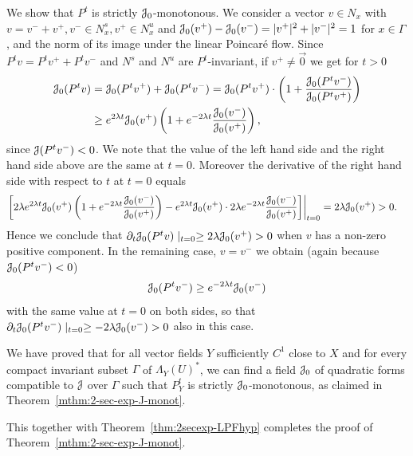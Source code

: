 \documentclass[12pt,reqno]{amsart}
\numberwithin{equation}{section}
\theoremstyle{plain}
\theoremstyle{definition}
\renewcommand{\epsilon}{\varepsilon}
\newcommand{\cO}{\EuScript{O}}
\newcommand{\J}{\EuScript{J}}
\begin{document}
We show that $P^t$ is strictly $\J_0$-monotonous.  We
consider a vector $v\in N_x$ with $v=v^-+v^+, v^-\in N_x^s,
v^+\in N^u_x$ and $\J_0(v^+)-\J_0(v^-)=|v^+|^2+|v^-|^2=1$
for $x\in\Gamma$, and the norm of its image under the linear
Poincar\'e flow. Since $P^tv=P^tv^++P^tv^-$ and $N^s$ and
$N^u$ are $P^t$-invariant, if $v^+\neq\vec0$ we get for
$t>0$
\begin{align*}
  \J_0(P^tv)
  &=
  \J_0(P^tv^+) +\J_0(P^tv^-)
  =
  \J_0(P^tv^+)\cdot
  \left(1+\frac{\J_0(P^tv^-)}{\J_0(P^tv^+)}\right)
  \\
  &\ge
  e^{2\lambda t}\J_0(v^+)\left(1+e^{-2\lambda
          t}\frac{\J_0(v^-)}{\J_0(v^+)}\right),
\end{align*}
since $\J(P^tv^-)<0$. We note that the value of the left
hand side and the right hand side above are the same at
$t=0$. Moreover the derivative of the right hand side with
respect to $t$ at $t=0$ equals
\begin{align*}
  \left.\left[
  2\lambda e^{2\lambda t}\J_0(v^+)\left(1+e^{-2\lambda
          t}\frac{\J_0(v^-)}{\J_0(v^+)}\right)
      - e^{2\lambda t}\J_0(v^+)\cdot
      2\lambda e^{-2\lambda t}\frac{\J_0(v^-)}{\J_0(v^+)}
    \right]\right|_{t=0}
  &=
  2\lambda\J_0(v^+)>0.
\end{align*}
Hence we conclude that $
  \partial_t\J_0(P^tv)\mid_{t=0}
  \ge 2\lambda\J_0(v^+)>0
$
when $v$ has a non-zero positive component. In the remaining
case, $v=v^-$ we obtain (again because $\J_0(P^tv^-)<0$)
\begin{align*}
  \J_0(P^tv^-)\ge e^{-2\lambda t}\J_0(v^-)
\end{align*}
with the same value at $t=0$ on both sides, so that
$  \partial_t\J_0(P^tv^-)\mid_{t=0} \ge
  -2\lambda\J_0(v^-)>0$
also in this case.

We have proved that for all vector fields $Y$ sufficiently
$C^1$ close to $X$ and for every compact invariant subset
$\Gamma$ of $\Lambda_Y(U)^*$, we can find a field $\J_0$ of
quadratic forms compatible to $\J$ over $\Gamma$ such that
$P^t_Y$ is strictly $\J_0$-monotonous, as claimed in
Theorem~\ref{mthm:2-sec-exp-J-monot}.

This together with Theorem~\ref{thm:2secexp-LPFhyp}
completes the proof of Theorem~\ref{mthm:2-sec-exp-J-monot}.

\end{document}
